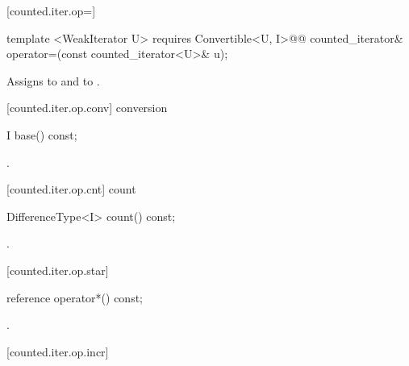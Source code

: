 \begin{addedblock}
[counted.iter.op=]{}

%
%
\begin{itemdecl}
template <WeakIterator U>
  requires Convertible<U, I>@\newtxt{()}@
counted_iterator& operator=(const counted_iterator<U>& u);
\end{itemdecl}

\begin{itemdescr}
\pnum
\effects Assigns  to
 and  to .

\end{itemdescr}

[counted.iter.op.conv]{ conversion}

%
%
\begin{itemdecl}
I base() const;
\end{itemdecl}

\begin{itemdescr}
\pnum
\returns {}.
\end{itemdescr}

[counted.iter.op.cnt]{ count}

%
%
\begin{itemdecl}
DifferenceType<I> count() const;
\end{itemdecl}

\begin{itemdescr}
\pnum
\returns {}.
\end{itemdescr}

[counted.iter.op.star]{}

%
%
\begin{itemdecl}
reference operator*() const;
\end{itemdecl}

\begin{itemdescr}
\pnum
\returns {}.
\end{itemdescr}

[counted.iter.op.incr]{}


\end{addedblock}
